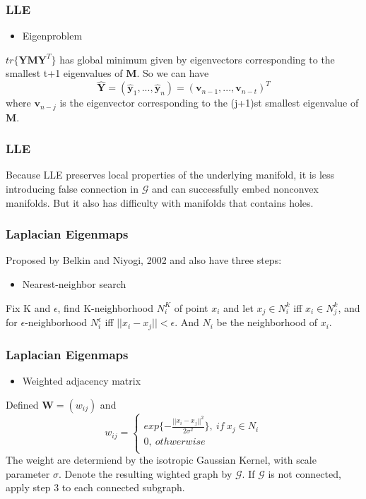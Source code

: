 \documentclass{beamer}
\begin{document}
\begin{frame}
\frametitle{LLE}
\begin{itemize}
  \item Eigenproblem
\end{itemize}
$tr\{\textbf{Y}\textbf{M}\textbf{Y}^T\}$ has global minimum given by eigenvectors corresponding to the smallest t+1 eigenvalues of $\textbf{M}$. So we can have 
\[\hat{\textbf{Y}}=(\hat{\textbf{y}}_1,...,\hat{\textbf{y}}_n)=(\textbf{v}_{n-1},...,\textbf{v}_{n-t})^T\]
where $\textbf{v}_{n-j}$ is the eigenvector corresponding to the (j+1)st smallest eigenvalue of $\textbf{M}$.
\end{frame}

\begin{frame}
\frametitle{LLE}
Because LLE preserves local properties of the underlying manifold, it is less introducing false connection in $\mathcal{G}$ and can successfully embed nonconvex manifolds. But it also has difficulty with manifolds that contains holes.
\end{frame}

\begin{frame}
\frametitle{Laplacian Eigenmaps}
Proposed by Belkin and Niyogi, 2002 and also have three steps:
\begin{itemize}
\item{Nearest-neighbor search}
\end{itemize}
Fix K and $\epsilon$, find K-neighborhood $N_i^K$ of point $x_i$ and let $x_j \in N_i^k$ iff $x_i \in N_j^k$, and for $\epsilon$-neighborhood $N_i^{\epsilon}$ iff $||x_i-x_j||<\epsilon$. And $N_i$ be the neighborhood of $x_i$.
\end{frame}

\begin{frame}
\frametitle{Laplacian Eigenmaps}
\begin{itemize}
\item{Weighted adjacency matrix}
\end{itemize}
Defined $\textbf{W}=(w_{ij})$ and 
\[w_{ij}=\left\{
                \begin{array}{ll}
                  exp\{-\frac{||x_i-x_j||^2}{2\sigma^2}\},\ if\ x_j\in N_i\\
                  0,\ othwerwise\\
                \end{array}
              \right.\]
The weight are determiend by the isotropic Gaussian Kernel, with scale parameter $\sigma$. Denote the resulting wighted graph by $\mathcal{G}$. If $\mathcal{G}$ is not connected, apply step 3 to each connected subgraph. 
\end{frame}
\end{document}
